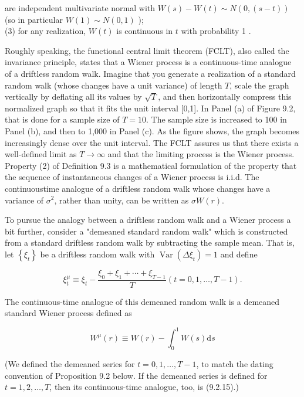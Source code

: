 \documentclass[10pt]{article}
\begin{document}
are independent multivariate normal with $W(s)-W(t) \sim N(0,(s-t))$ (so in particular $W(1) \sim N(0,1)$ );\\
(3) for any realization, $W(t)$ is continuous in $t$ with probability 1 .

Roughly speaking, the functional central limit theorem (FCLT), also called the invariance principle, states that a Wiener process is a continuous-time analogue of a driftless random walk. Imagine that you generate a realization of a standard random walk (whose changes have a unit variance) of length $T$, scale the graph vertically by deflating all its values by $\sqrt{T}$, and then horizontally compress this normalized graph so that it fits the unit interval [0,1]. In Panel (a) of Figure 9.2, that is done for a sample size of $T=10$. The sample size is increased to 100 in Panel (b), and then to 1,000 in Panel (c). As the figure shows, the graph becomes increasingly dense over the unit interval. The FCLT assures us that there exists a well-defined limit as $T \rightarrow \infty$ and that the limiting process is the Wiener process. Property (2) of Definition 9.3 is a mathematical formulation of the property that the sequence of instantaneous changes of a Wiener process is i.i.d. The continuoustime analogue of a driftless random walk whose changes have a variance of $\sigma^{2}$, rather than unity, can be written as $\sigma W(r)$.

To pursue the analogy between a driftless random walk and a Wiener process a bit further, consider a "demeaned standard random walk" which is constructed from a standard driftless random walk by subtracting the sample mean. That is, let $\left\{\xi_{t}\right\}$ be a driftless random walk with $\operatorname{Var}\left(\Delta \xi_{t}\right)=1$ and define


\begin{equation*}
\xi_{t}^{\mu} \equiv \xi_{t}-\frac{\xi_{0}+\xi_{1}+\cdots+\xi_{T-1}}{T}(t=0,1, \ldots, T-1) . \tag{9.2.14}
\end{equation*}


The continuous-time analogue of this demeaned random walk is a demeaned standard Wiener process defined as


\begin{equation*}
W^{\mu}(r) \equiv W(r)-\int_{0}^{1} W(s) \mathrm{d} s \tag{9.2.15}
\end{equation*}


(We defined the demeaned series for $t=0,1, \ldots, T-1$, to match the dating convention of Proposition 9.2 below. If the demeaned series is defined for $t= 1,2, \ldots, T$, then its continuous-time analogue, too, is (9.2.15).)
\end{document}
